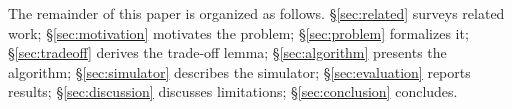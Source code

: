 The remainder of this paper is organized as follows.
\S\ref{sec:related} surveys related work; \S\ref{sec:motivation}
motivates the problem; \S\ref{sec:problem} formalizes it;
\S\ref{sec:tradeoff} derives the trade-off lemma;
\S\ref{sec:algorithm} presents the algorithm; \S\ref{sec:simulator}
describes the simulator; \S\ref{sec:evaluation} reports results;
\S\ref{sec:discussion} discusses limitations; \S\ref{sec:conclusion}
concludes.
